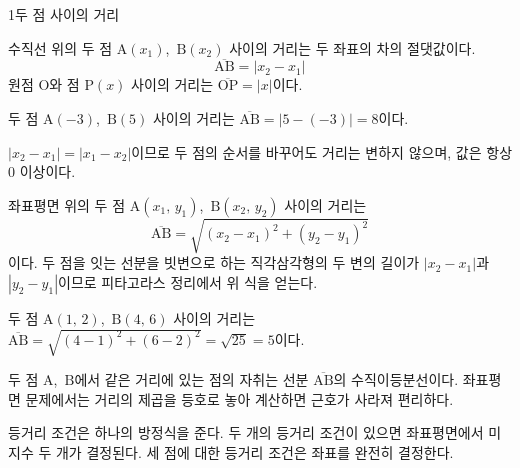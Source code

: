 \documentclass[10pt,a4paper]{article}
\begin{document}

\begin{dmconcept}{1}{두 점 사이의 거리}


수직선 위의 두 점 $\mathrm{A}(x_1)$,\ $\mathrm{B}(x_2)$ 사이의 거리는 두 좌표의
차의 절댓값이다.
\begin{equation*}
  \overline{\mathrm{AB}} = |x_2 - x_1|
\end{equation*}
원점 $\mathrm{O}$와 점 $\mathrm{P}(x)$ 사이의 거리는 $\overline{\mathrm{OP}} = |x|$이다.

\begin{dmexample}
두 점 $\mathrm{A}(-3)$,\ $\mathrm{B}(5)$ 사이의 거리는
$\overline{\mathrm{AB}} = |5 - (-3)| = 8$이다.
\end{dmexample}

\begin{dmnote}
$|x_2 - x_1| = |x_1 - x_2|$이므로 두 점의 순서를 바꾸어도 거리는 변하지 않으며,
값은 항상 $0$ 이상이다.
\end{dmnote}


좌표평면 위의 두 점 $\mathrm{A}(x_1,\, y_1)$,\ $\mathrm{B}(x_2,\, y_2)$ 사이의 거리는
\begin{equation*}
  \overline{\mathrm{AB}} = \sqrt{(x_2 - x_1)^2 + (y_2 - y_1)^2}
\end{equation*}
이다. 두 점을 잇는 선분을 빗변으로 하는 직각삼각형의 두 변의 길이가
$|x_2 - x_1|$과 $|y_2 - y_1|$이므로 피타고라스 정리에서 위 식을 얻는다.

\begin{dmexample}
두 점 $\mathrm{A}(1,\, 2)$,\ $\mathrm{B}(4,\, 6)$ 사이의 거리는
$\overline{\mathrm{AB}} = \sqrt{(4-1)^2 + (6-2)^2} = \sqrt{25} = 5$이다.
\end{dmexample}


두 점 $\mathrm{A}$,\ $\mathrm{B}$에서 같은 거리에 있는 점의 자취는
선분 $\overline{\mathrm{AB}}$의 수직이등분선이다. 좌표평면 문제에서는 거리의
제곱을 등호로 놓아 계산하면 근호가 사라져 편리하다.

\begin{dmnote}
등거리 조건은 하나의 방정식을 준다. 두 개의 등거리 조건이 있으면 좌표평면에서
미지수 두 개가 결정된다. 세 점에 대한 등거리 조건은 좌표를 완전히 결정한다.
\end{dmnote}

\end{dmconcept}
\end{document}
